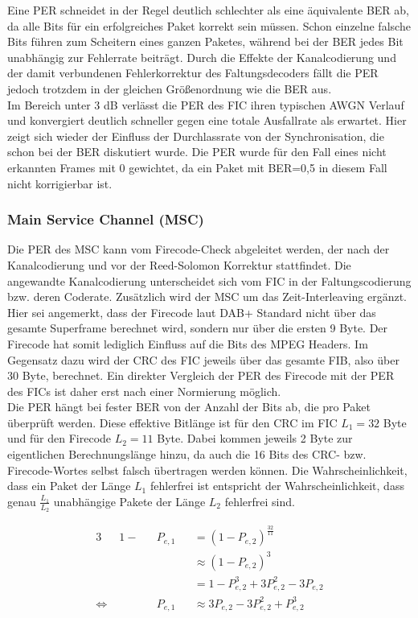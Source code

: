 Eine PER schneidet in der Regel deutlich schlechter als eine äquivalente BER ab, da alle Bits für ein erfolgreiches Paket korrekt sein müssen. Schon einzelne falsche Bits führen zum Scheitern eines ganzen Paketes, während bei der BER jedes Bit unabhängig zur Fehlerrate beiträgt. Durch die Effekte der Kanalcodierung und der damit verbundenen Fehlerkorrektur des Faltungsdecoders fällt die PER jedoch trotzdem in der gleichen Größenordnung wie die BER aus. \\
Im Bereich unter 3 dB verlässt die PER des FIC ihren typischen AWGN Verlauf und konvergiert deutlich schneller gegen eine totale Ausfallrate als erwartet. Hier zeigt sich wieder der Einfluss der Durchlassrate von der Synchronisation, die schon bei der BER diskutiert wurde. Die PER wurde für den Fall eines nicht erkannten Frames mit 0 gewichtet, da ein Paket mit BER=0,5 in diesem Fall nicht korrigierbar ist.\\
\subsubsection{Main Service Channel (MSC)}
Die PER des MSC kann vom Firecode-Check abgeleitet werden, der nach der Kanalcodierung und vor der Reed-Solomon Korrektur stattfindet. Die angewandte Kanalcodierung unterscheidet sich vom FIC in der Faltungscodierung bzw. deren Coderate. Zusätzlich wird der MSC um das Zeit-Interleaving ergänzt.\\
Hier sei angemerkt, dass der Firecode laut DAB+ Standard nicht über das gesamte Superframe berechnet wird, sondern nur über die ersten 9 Byte. Der Firecode hat somit lediglich Einfluss auf die Bits des MPEG Headers. Im Gegensatz dazu wird der CRC des FIC jeweils über das gesamte FIB, also über 30 Byte, berechnet. Ein direkter Vergleich der PER des Firecode mit der PER des FICs ist daher erst nach einer Normierung möglich.\\
Die PER hängt bei fester BER von der Anzahl der Bits ab, die pro Paket überprüft werden. Diese effektive Bitlänge ist für den CRC im FIC $L_1 = 32$ Byte und für den Firecode $L_2 = 11$ Byte. Dabei kommen jeweils 2 Byte zur eigentlichen Berechnungslänge hinzu, da auch die 16 Bits des CRC- bzw. Firecode-Wortes selbst falsch übertragen werden können. Die Wahrscheinlichkeit, dass ein Paket der Länge $L_1$ fehlerfrei ist entspricht der Wahrscheinlichkeit, dass genau $\frac{L_1}{L_2}$ unabhängige Pakete der Länge $L_2$ fehlerfrei sind.

\begin{alignat}{3}
&1-&&P_{e,1} &&= (1-P_{e,2})^\frac{32}{11}\nonumber \\
& && &&\approx (1-P_{e,2})^3\nonumber \\
& && &&= 1-P_{e,2}^3+3P_{e,2}^2-3P_{e,2}\nonumber \\
\Leftrightarrow\; & &&P_{e,1} &&\approx 3P_{e,2}-3P_{e,2}^2+P_{e,2}^3 \label{eq:per}
\end{alignat}

